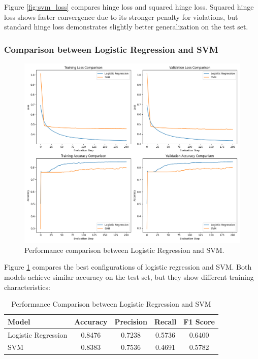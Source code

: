 \documentclass[journal, a4paper]{IEEEtran}
\begin{document}
Figure \ref{fig:svm_loss} compares hinge loss and squared hinge loss. Squared hinge loss shows faster convergence due to its stronger penalty for violations, but standard hinge loss demonstrates slightly better generalization on the test set.

\subsubsection{Comparison between Logistic Regression and SVM}

\begin{figure}[H]
\centering
\includegraphics[width=\linewidth]{lr_vs_svm_comparison.png}
\caption{Performance comparison between Logistic Regression and SVM.}
\label{fig:lr_vs_svm}
\end{figure}

Figure \ref{fig:lr_vs_svm} compares the best configurations of logistic regression and SVM. Both models achieve similar accuracy on the test set, but they show different training characteristics:

\begin{table}[H]
\centering
\caption{Performance Comparison between Logistic Regression and SVM}
\label{tab:comparison}
\begin{tabular}{lcccc}
\toprule
\textbf{Model} & \textbf{Accuracy} & \textbf{Precision} & \textbf{Recall} & \textbf{F1 Score} \\
\midrule
Logistic Regression & 0.8476 & 0.7238 & 0.5736 & 0.6400 \\
SVM & 0.8383 & 0.7536 & 0.4691 & 0.5782 \\
\bottomrule
\end{tabular}
\end{table}
\end{document}

